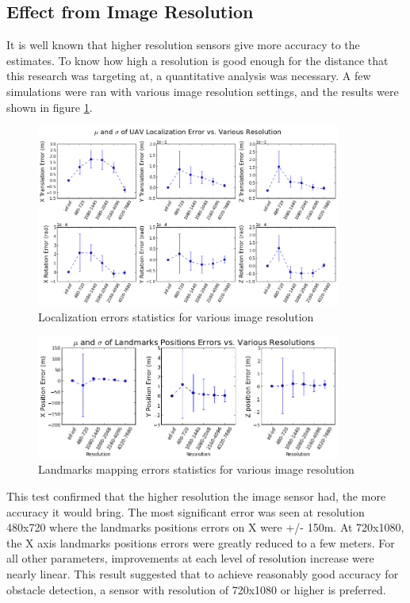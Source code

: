 \subsection{Effect from Image Resolution}

It is well known that higher resolution sensors give more accuracy
to the estimates. To know how high a resolution is good enough for the
distance that this research was targeting at, a quantitative
analysis was necessary. A few simulations were ran with various image
resolution settings, and the results were shown in figure
\ref{fig:simfig50}.

\begin{figure}[h] 
  \centering
  \includegraphics[width=10cm,keepaspectratio=true]{./Figures/SimulationFigures/Figure50.png}
  \caption{Localization errors statistics for various image resolution}
  \label{fig:simfig50}
\end{figure}

\begin{figure}[h] %
  \centering
  \includegraphics[width=10cm,keepaspectratio=true]{./Figures/SimulationFigures/Figure49.png}
  \caption{Landmarks mapping errors statistics for various image resolution}
  \label{fig:simfig51}
\end{figure}

This test confirmed that the higher resolution the image sensor had,
the more accuracy it would bring. The most significant error was seen
at resolution 480x720 where the landmarks positions errors on X were
+/- 150m. At 720x1080, the X axis landmarks positions errors were
greatly reduced to a few meters. For all other parameters,
improvements at each level of resolution increase were nearly linear.
This result suggested that to achieve reasonably good accuracy for
obstacle detection, a sensor with resolution of 720x1080 or higher is
preferred.


